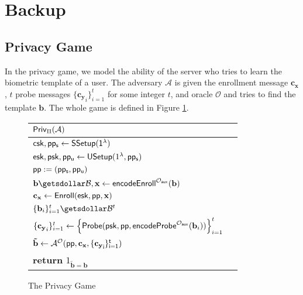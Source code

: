 \section*{Backup}
\subsection*{Privacy Game}

In the privacy game, we model the ability of the server who tries to learn the biometric template of a user. The adversary $\mathcal{A}$ is given the enrollment message $\mathbf{c_x}$, $t$ probe messages $\{ \mathbf{c_y}_i\}_{i=1}^t$ for some integer $t$, and oracle $\mathcal{O}$ and tries to find the template $\mathbf{b}$. The whole game is defined in Figure \ref{fig:privacy_game}.


\begin{figure}[h]
	\begin{center}
		\begin{tabular}{l c}
			${\sf Priv}_{\Pi}(\mathcal{A})$\\

			\hline

			${\sf csk}, {\sf pp_s} \gets {\sf SSetup(1^\lambda)}$ \\

			${\sf esk}, {\sf psk}, {\sf pp_u} \gets {\sf USetup}(1^\lambda, {\sf pp_s})$ \\

			${\sf pp}:= ({\sf pp_s}, {\sf pp_u})$ \\

			$ \mathbf{b} \getsdollar \mathcal{B}, \mathbf{x} \gets {\sf encodeEnroll}^{\mathcal{O}_{\sf aux}}(\mathbf{b})$ \\

			$\mathbf{c_x} \gets {\sf Enroll}({\sf esk}, {\sf pp}, \mathbf{x})$ \\

			$\{ \mathbf{b}_i \}_{i=1}^t \getsdollar \mathcal{B}^t$ \\ 

			$\{ \mathbf{c_y}_i \}_{i=1}^t \gets \left\{ {\sf Probe}( {\sf psk}, {\sf pp}, {\sf encodeProbe}^{\mathcal{O}_{\sf aux}}(\mathbf{b}_i) ) \right \}_{i=1}^t$ \\

			${\mathbf{\tilde{b}}} \gets \mathcal{A}^{\mathcal{O}} ( \sf{pp}, \mathbf{c_x}, \{ \mathbf{c_y}_i \}_{i=1}^t )$ \\

			\textbf{return} $1_{\mathbf{\tilde{b}} = \mathbf{b}}$
			
		\end{tabular}
	\end{center}
	\caption{The Privacy Game}
	\label{fig:privacy_game}
\end{figure}


